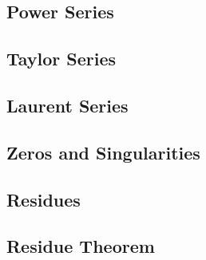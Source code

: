 \subsection{Power Series}

\subsection{Taylor Series}

\subsection{Laurent Series}

\subsection{Zeros and Singularities}

\subsection{Residues}

\subsection{Residue Theorem}



